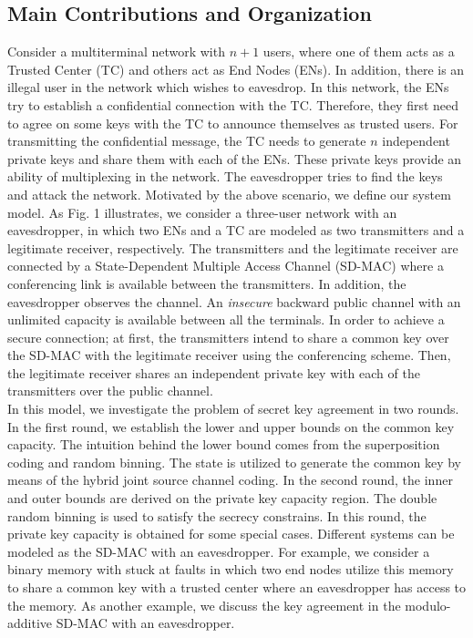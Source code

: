 \documentclass[conference,8pt]{IEEEtran}
\begin{document}
\subsection*{Main Contributions and Organization}{
Consider a multiterminal network with $n+1$ users, where one of them acts as a Trusted Center (TC) and others act as End Nodes (ENs). In addition, there is an illegal user in the network which wishes to eavesdrop. In this network, the ENs try to establish a confidential connection with the TC. Therefore, they first need to agree on some keys with the TC to announce themselves as trusted users. For transmitting the confidential message, the TC needs to generate $n$ independent private keys and share them with each of the ENs. These private keys provide an ability of multiplexing in the network. The eavesdropper tries to find the keys and attack the network. Motivated by the above scenario, we define our system model. As Fig. 1 illustrates, we consider a three-user network with an eavesdropper, in which two ENs and a TC are modeled as two transmitters and a legitimate receiver, respectively. The transmitters and the legitimate receiver are connected by a State-Dependent Multiple Access Channel (SD-MAC) where a conferencing link is available between the transmitters. In addition, the eavesdropper observes the channel. An \emph{insecure} backward public channel with an unlimited capacity is available between all the terminals. In order to achieve a secure connection; at first, the transmitters intend to share a common key over the SD-MAC with the legitimate receiver using the conferencing scheme. Then, the legitimate receiver shares an independent private key with each of the transmitters over the public channel.\\

In this model, we investigate the problem of secret key agreement in two rounds. In the first round, we establish the lower and upper bounds on the common key capacity. The intuition behind the lower bound comes from the superposition coding and random binning. The state is utilized to generate the common key by means of the hybrid joint source channel coding. In the second round, the inner and outer bounds are derived on the private key capacity region. The double random binning is used to satisfy the secrecy constrains. In this round, the private key capacity is obtained for some special cases. Different systems can be modeled as the SD-MAC with an eavesdropper. For example, we consider a binary memory with stuck at faults in which two end nodes utilize this memory to share a common key with a trusted center where an eavesdropper has access to the memory. As another example, we discuss the key agreement in the modulo-additive SD-MAC with an eavesdropper.\\

}
\end{document}
